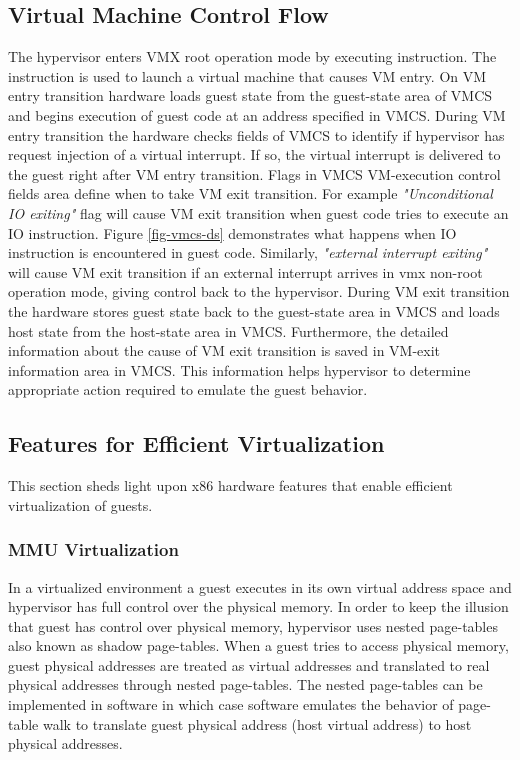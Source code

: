 \subsection{Virtual Machine Control Flow}
The hypervisor enters VMX root operation mode by executing \mVMXON{} instruction.
The \mVMLAUNCH{} instruction is used to launch a virtual machine that causes VM entry.
On VM entry transition hardware loads guest state from the guest-state area of VMCS
and begins execution of guest code at an address specified in VMCS.
During VM entry transition the hardware checks fields of VMCS to 
identify if hypervisor has request injection of a virtual interrupt.
If so, the virtual interrupt is delivered to the guest right after VM entry transition.
Flags in VMCS VM-execution control fields area define when to take VM exit transition.
For example \emph{"Unconditional IO exiting"} flag will cause VM exit transition 
when guest code tries to execute an IO instruction. Figure \ref{fig-vmcs-ds} demonstrates 
what happens when IO instruction is encountered in guest code.
Similarly, \emph{"external interrupt exiting"} will cause VM exit transition if
an external interrupt arrives in vmx non-root operation mode, giving control back to the hypervisor.
During VM exit transition the hardware stores guest state back to the guest-state area in VMCS and
loads host state from the host-state area in VMCS.
Furthermore, the detailed information about the cause of VM exit transition is
saved in VM-exit information area in VMCS. This information helps hypervisor
to determine appropriate action required to emulate the guest behavior.

\subsection{Features for Efficient Virtualization}
This section sheds light upon x86 hardware features that enable efficient virtualization of guests.

\subsubsection{MMU Virtualization} \label{sec:vmmu}
In a virtualized environment a guest executes in its own virtual address space and hypervisor has full control over the physical memory.
In order to keep the illusion that guest has control over physical memory, hypervisor uses nested page-tables also known as shadow page-tables.
When a guest tries to access physical memory, guest physical addresses are treated as virtual addresses and 
translated to real physical addresses through nested page-tables.
The nested page-tables can be implemented in software in which case software emulates the behavior of page-table walk to
translate guest physical address (host virtual address) to host physical addresses.

